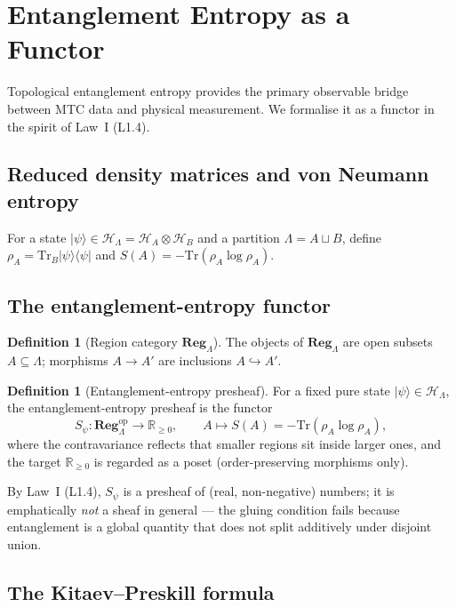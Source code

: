 \documentclass[12pt]{article}
\theoremstyle{plain}
\theoremstyle{definition}
\newtheorem{definition}[theorem]{Definition}
\theoremstyle{remark}
\newcommand{\Tr}{\mathrm{Tr}}
\begin{document}
\section{Entanglement Entropy as a Functor}
\label{sec:eee}

Topological entanglement entropy provides the primary observable bridge between MTC data
and physical measurement. We formalise it as a functor in the spirit of Law~I (L1.4).

\subsection{Reduced density matrices and von Neumann entropy}

For a state $|\psi\rangle\in\mathcal{H}_{\Lambda}=\mathcal{H}_{A}\otimes\mathcal{H}_{B}$
and a partition $\Lambda=A\sqcup B$, define
$\rho_{A}=\Tr_{B}|\psi\rangle\langle\psi|$ and
$S(A)=-\Tr(\rho_{A}\log\rho_{A})$.

\subsection{The entanglement-entropy functor}

\begin{definition}[Region category $\mathbf{Reg}_{\Lambda}$]
\label{def:regcat}
The objects of $\mathbf{Reg}_{\Lambda}$ are open subsets $A\subseteq\Lambda$;
morphisms $A\to A'$ are inclusions $A\hookrightarrow A'$.
\end{definition}

\begin{definition}[Entanglement-entropy presheaf]
\label{def:s-functor}
For a fixed pure state $|\psi\rangle\in\mathcal{H}_{\Lambda}$, the entanglement-entropy
presheaf is the functor
\[
S_{\psi}:\mathbf{Reg}_{\Lambda}^{\mathrm{op}}\to\mathbb{R}_{\geq 0}, \qquad
A \mapsto S(A) = -\Tr(\rho_{A}\log\rho_{A}),
\]
where the contravariance reflects that smaller regions sit inside larger ones, and the
target $\mathbb{R}_{\geq 0}$ is regarded as a poset (order-preserving morphisms only).
\end{definition}

By Law~I (L1.4), $S_{\psi}$ is a presheaf of (real, non-negative) numbers; it is
emphatically \emph{not} a sheaf in general --- the gluing condition fails because
entanglement is a global quantity that does not split additively under disjoint union.

\subsection{The Kitaev--Preskill formula}
\end{document}
